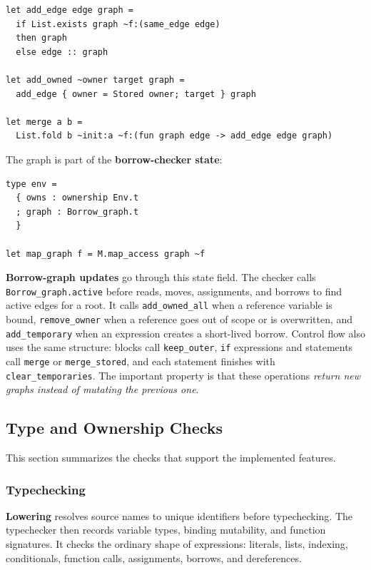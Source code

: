 \documentclass[a4paper]{article}
\begin{document}
\begin{lstlisting}
let add_edge edge graph =
  if List.exists graph ~f:(same_edge edge)
  then graph
  else edge :: graph

let add_owned ~owner target graph =
  add_edge { owner = Stored owner; target } graph

let merge a b =
  List.fold b ~init:a ~f:(fun graph edge -> add_edge edge graph)
\end{lstlisting}

The graph is part of the \textbf{borrow-checker state}:

\begin{lstlisting}
type env =
  { owns : ownership Env.t
  ; graph : Borrow_graph.t
  }

let map_graph f = M.map_access graph ~f
\end{lstlisting}

\textbf{Borrow-graph updates} go through this state field. The checker calls
\texttt{Borrow\_graph.active} before reads,
moves, assignments, and borrows to find active edges for a root. It calls
\texttt{add\_owned\_all} when a reference variable is bound, \texttt{remove\_owner}
when a reference goes out of scope or is overwritten, and \texttt{add\_temporary}
when an expression creates a short-lived borrow. Control flow also uses the same
structure: blocks call \texttt{keep\_outer}, \texttt{if} expressions and
statements call \texttt{merge} or \texttt{merge\_stored}, and each statement
finishes with \texttt{clear\_temporaries}. The important property is that these
operations \emph{return new graphs instead of mutating the previous one}.

\subsection{Type and Ownership Checks}

This section summarizes the checks that support the implemented features.

\subsubsection{Typechecking}

\textbf{Lowering} resolves source names to unique identifiers before
typechecking. The typechecker then records variable types, binding mutability,
and function signatures. It checks the ordinary shape of expressions: literals,
lists, indexing, conditionals, function calls, assignments, borrows, and
dereferences.
\end{document}
